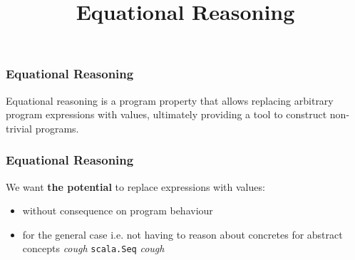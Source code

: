 {


  \begin{frame}[plain] 
  \title{Equational Reasoning}
  
  \vspace{3em}

  \begin{TitleBoxEquationalReasoning}
    \begin{center}
    {\Large \inserttitle}
    \end{center}
  \end{TitleBoxEquationalReasoning}

  \end{frame}
}

\begin{frame}
\frametitle{Equational Reasoning}
\begin{block}{Equational reasoning is a program property}
that allows replacing arbitrary program expressions with values, ultimately providing a tool to construct non-trivial programs.
\end{block}
\end{frame}

\begin{frame}
\frametitle{Equational Reasoning}
We want \textbf{the potential} to replace expressions with values:
\begin{itemize}
  \item<1> without consequence on program behaviour
  \item<2> for the general case i.e. not having to reason about concretes for abstract concepts \tiny{\emph{cough} \lstinline{scala.Seq} \emph{cough}}\normalsize
\end{itemize}
\end{frame}

